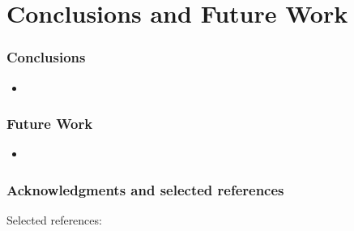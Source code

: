 \documentclass{beamer}
\begin{document}
\section{Conclusions and Future Work}

\begin{frame}
\frametitle{Conclusions}
\begin{itemize}
\item
\end{itemize}
\end{frame}

\begin{frame}
\frametitle{Future Work}
\begin{itemize}
\item
\end{itemize}
\end{frame}

\begin{frame}
\frametitle{Acknowledgments and selected references}
Selected references:
\end{frame}
\end{document}
